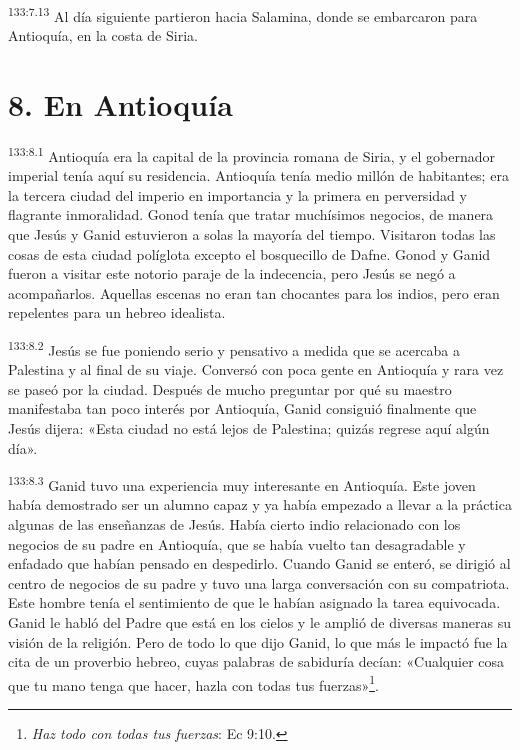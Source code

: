 \par
\textsuperscript{133:7.13} Al día siguiente partieron hacia Salamina, donde se embarcaron para Antioquía, en la costa de Siria.

\section*{8. En Antioquía}
\par
\textsuperscript{133:8.1} Antioquía era la capital de la provincia romana de Siria, y el gobernador imperial tenía aquí su residencia. Antioquía tenía medio millón de habitantes; era la tercera ciudad del imperio en importancia y la primera en perversidad y flagrante inmoralidad. Gonod tenía que tratar muchísimos negocios, de manera que Jesús y Ganid estuvieron a solas la mayoría del tiempo. Visitaron todas las cosas de esta ciudad políglota excepto el bosquecillo de Dafne. Gonod y Ganid fueron a visitar este notorio paraje de la indecencia, pero Jesús se negó a acompañarlos. Aquellas escenas no eran tan chocantes para los indios, pero eran repelentes para un hebreo idealista.

\par
\textsuperscript{133:8.2} Jesús se fue poniendo serio y pensativo a medida que se acercaba a Palestina y al final de su viaje. Conversó con poca gente en Antioquía y rara vez se paseó por la ciudad. Después de mucho preguntar por qué su maestro manifestaba tan poco interés por Antioquía, Ganid consiguió finalmente que Jesús dijera: «Esta ciudad no está lejos de Palestina; quizás regrese aquí algún día».

\par
\textsuperscript{133:8.3} Ganid tuvo una experiencia muy interesante en Antioquía. Este joven había demostrado ser un alumno capaz y ya había empezado a llevar a la práctica algunas de las enseñanzas de Jesús. Había cierto indio relacionado con los negocios de su padre en Antioquía, que se había vuelto tan desagradable y enfadado que habían pensado en despedirlo. Cuando Ganid se enteró, se dirigió al centro de negocios de su padre y tuvo una larga conversación con su compatriota. Este hombre tenía el sentimiento de que le habían asignado la tarea equivocada. Ganid le habló del Padre que está en los cielos y le amplió de diversas maneras su visión de la religión. Pero de todo lo que dijo Ganid, lo que más le impactó fue la cita de un proverbio hebreo, cuyas palabras de sabiduría decían: «Cualquier cosa que tu mano tenga que hacer, hazla con todas tus fuerzas»\footnote{\textit{Haz todo con todas tus fuerzas}: Ec 9:10.}.

